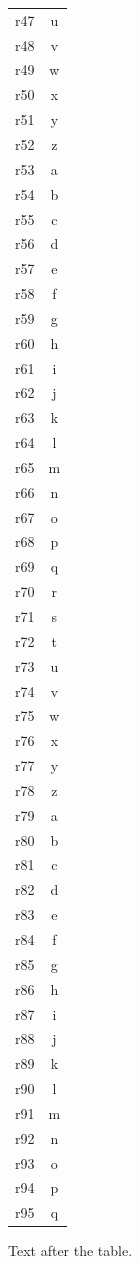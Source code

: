 \documentclass[12pt]{article}
\begin{document}
\begin{longtable}{lc}
r47 & u\\
r48 & v\\
r49 & w\\
r50 & x\\
r51 & y\\
r52 & z\\
r53 & a\\
r54 & b\\
r55 & c\\
r56 & d\\
r57 & e\\
r58 & f\\
r59 & g\\
r60 & h\\
r61 & i\\
r62 & j\\
r63 & k\\
r64 & l\\
r65 & m\\
r66 & n\\
r67 & o\\
r68 & p\\
r69 & q\\
r70 & r\\
r71 & s\\
r72 & t\\
r73 & u\\
r74 & v\\
r75 & w\\
r76 & x\\
r77 & y\\
r78 & z\\
r79 & a\\
r80 & b\\
r81 & c\\
r82 & d\\
r83 & e\\
r84 & f\\
r85 & g\\
r86 & h\\
r87 & i\\
r88 & j\\
r89 & k\\
r90 & l\\
r91 & m\\
r92 & n\\
r93 & o\\
r94 & p\\
r95 & q\\
\end{longtable}

Text after the table.
\end{document}

